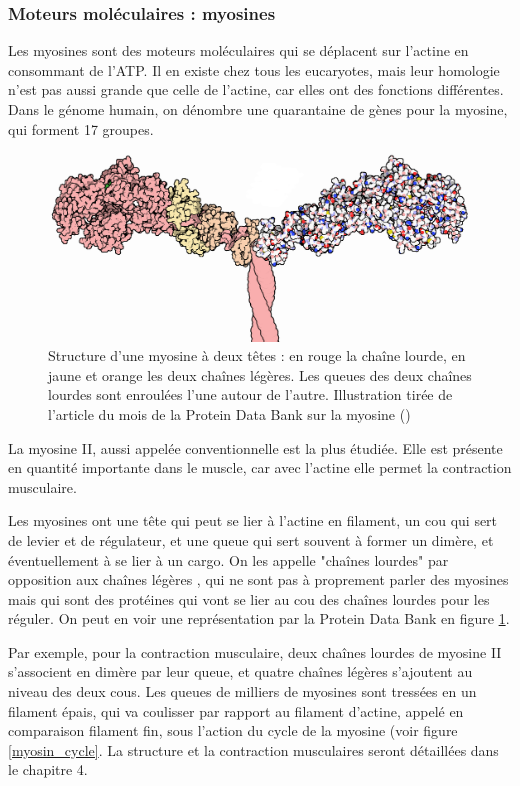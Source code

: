  



\subsubsection{Moteurs moléculaires : myosines}

Les myosines sont des moteurs moléculaires qui se déplacent sur l'actine en consommant de l'ATP. Il en existe chez tous les eucaryotes, mais leur homologie n'est pas aussi grande que celle de l'actine, car elles ont des fonctions différentes. Dans le génome humain, on dénombre une quarantaine de gènes pour la myosine, qui forment 17 groupes.

\begin{figure}
\includegraphics[scale=3]{Figures/18-Myosin-1b7t.png} 
\caption{Structure d'une myosine à deux têtes : en rouge la chaîne lourde, en jaune et orange les deux chaînes légères. Les queues des deux chaînes lourdes sont enroulées l'une autour de l'autre. Illustration tirée de l'article du mois de la Protein Data Bank sur la myosine (\cite{goodsell_molecule_2010}) \label{myosin}}
\end{figure}

La myosine II, aussi appelée \og conventionnelle \fg est la plus étudiée. Elle est présente en quantité importante dans le muscle, car avec l'actine elle permet la contraction musculaire. 

Les myosines ont une tête qui peut se lier à l'actine en filament, un cou  qui sert de levier et de régulateur, et une queue qui sert souvent à former un dimère, et éventuellement à se lier à un cargo. On les appelle "chaînes lourdes" par opposition aux \og chaînes légères \fg, qui ne sont pas à proprement parler des myosines mais qui sont des protéines qui vont se lier au cou des \og chaînes lourdes \fg pour les réguler. On peut en voir une représentation par la Protein Data Bank en figure \ref{myosin}.

Par exemple, pour la contraction musculaire, deux chaînes lourdes de myosine II s'associent en dimère par leur queue, et quatre chaînes légères s'ajoutent au niveau des deux cous. Les queues de milliers de myosines sont tressées en un filament épais, qui va coulisser par rapport au filament d'actine, appelé en comparaison filament fin, sous l'action du cycle de la myosine (voir figure \ref{myosin_cycle}. La structure et la contraction musculaires seront détaillées dans le chapitre 4. 

